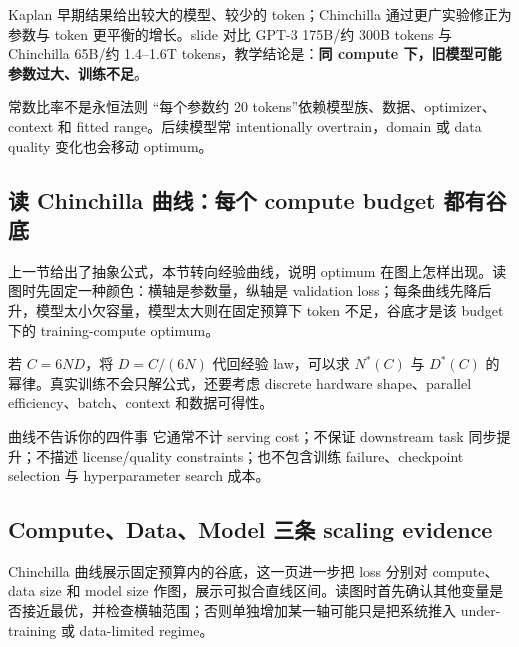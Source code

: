 Kaplan 早期结果给出较大的模型、较少的 token；Chinchilla 通过更广实验修正为参数与 token 更平衡的增长。slide 对比 GPT-3 175B/约 300B tokens 与 Chinchilla 65B/约 1.4--1.6T tokens，教学结论是：\textbf{同 compute 下，旧模型可能参数过大、训练不足}。

\begin{warningbox}{常数比率不是永恒法则}
“每个参数约 20 tokens”依赖模型族、数据、optimizer、context 和 fitted range。后续模型常 intentionally overtrain，domain 或 data quality 变化也会移动 optimum。
\end{warningbox}


\subsection{读 Chinchilla 曲线：每个 compute budget 都有谷底}

上一节给出了抽象公式，本节转向经验曲线，说明 optimum 在图上怎样出现。读图时先固定一种颜色：横轴是参数量，纵轴是 validation loss；每条曲线先降后升，模型太小欠容量，模型太大则在固定预算下 token 不足，谷底才是该 budget 下的 training-compute optimum。


若 $C=6ND$，将 $D=C/(6N)$ 代回经验 law，可以求 $N^*(C)$ 与 $D^*(C)$ 的幂律。真实训练不会只解公式，还要考虑 discrete hardware shape、parallel efficiency、batch、context 和数据可得性。

\begin{knowledgebox}{曲线不告诉你的四件事}
它通常不计 serving cost；不保证 downstream task 同步提升；不描述 license/quality constraints；也不包含训练 failure、checkpoint selection 与 hyperparameter search 成本。
\end{knowledgebox}

\subsection{Compute、Data、Model 三条 scaling evidence}

Chinchilla 曲线展示固定预算内的谷底，这一页进一步把 loss 分别对 compute、data size 和 model size 作图，展示可拟合直线区间。读图时首先确认其他变量是否接近最优，并检查横轴范围；否则单独增加某一轴可能只是把系统推入 under-training 或 data-limited regime。

